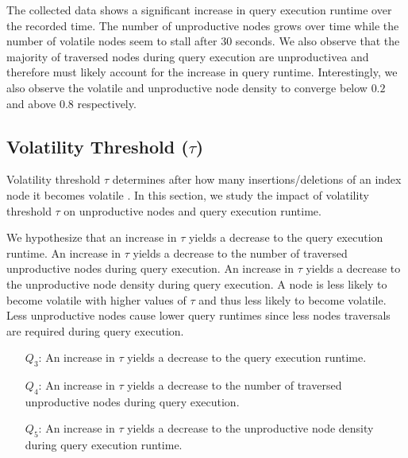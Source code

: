 \documentclass[abstracton,12pt]{scrartcl}
\theoremstyle{definition}
\begin{document}
The collected data shows a significant increase in query execution runtime over the
recorded time. The number of unproductive nodes grows over time while the number
of volatile nodes seem to stall after 30 seconds. We also observe that the
majority of traversed nodes during query execution are unproductivea and
therefore must likely account for the increase in query runtime. Interestingly,
we also observe the volatile and unproductive node density to converge below
$0.2$ and above $0.8$ respectively.

\subsection{Volatility Threshold ($\tau$)}

Volatility threshold $\tau$ determines after how many insertions/deletions of an index node
it becomes volatile \cite{KW17}. In this section, we study the impact of
volatility threshold $\tau$ on unproductive nodes and query execution runtime.

We hypothesize that an increase in $\tau$ yields a decrease to the query
execution runtime.
An increase in $\tau$ yields a decrease to the number of traversed unproductive
nodes during query execution.
An increase in $\tau$ yields a decrease to the unproductive node density during
query execution.
A node is less likely to become volatile with higher values
of $\tau$ and thus less likely to become volatile. 
Less unproductive nodes cause lower query  runtimes since less nodes traversals
are required during query execution.

\begin{shaded}
  \begin{itemize}
  \item[$Q_3$:] An increase in $\tau$ yields a decrease to the query execution runtime. 
  \item[$Q_4$:] An increase in $\tau$ yields a decrease to the number of
    traversed unproductive nodes during query execution.
  \item[$Q_5$:] An increase in $\tau$ yields a decrease to the unproductive node
    density during query execution 
    runtime.
  \end{itemize}
\end{shaded}
\end{document}
